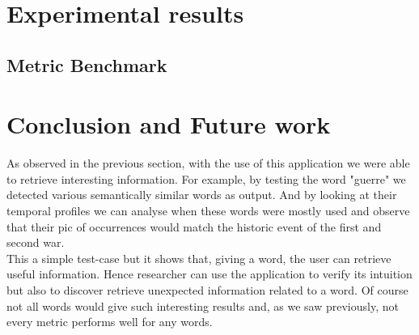 \documentclass{article}
\begin{document}
\section{Experimental results}
\subsection{Metric Benchmark}

\section{Conclusion and Future work}

As observed in the previous section, with the use of this application we were able to retrieve interesting information. For example, by testing the word "guerre" we detected various semantically similar words as output. And by looking at their temporal profiles we can analyse when these words were mostly used and observe that their pic of occurrences would match the historic event of the first and second war. \\

This a simple test-case but it shows that, giving a word, the user can retrieve useful information. Hence researcher can use the application to verify its intuition but also to discover retrieve unexpected information related to a word. Of course not all words would give such interesting results and, as we saw previously, not every metric performs well for any words.


 
\end{document}
